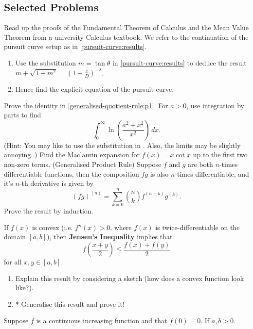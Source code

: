 \documentclass[../main.tex]{subfiles}
\begin{document}
\subsection{Selected Problems}
\problem Read up the proofs of the Fundamental Theorem of Calculus and the Mean Value Theorem from a university Calculus textbook.
\problem We refer to the continuation of the pursuit curve setup as in \ref{pursuit-curve:results}.
\begin{enumerate}
    \item Use the substitution $m=\tan\theta$ in \ref{pursuit-curve:results} to deduce the result $m+\sqrt{1+m^2}=\left(1-\frac{x}{D}\right)^{-\lambda}$.
    \item Hence find the explicit equation of the pursuit curve.
\end{enumerate}
\problem Prove the identity in \ref{generalised-quotient-rule:p1}.
\problem* For $a > 0$, use integration by parts to find
$$\int_{0}^{\infty}\ln{\left(\frac{a^2+x^2}{x^2}\right)}\, dx.$$
(Hint: You may like to use the substitution in . Also, the limits may be slightly annoying..)
\problem Find the Maclaurin expansion for $f(x)=x\cot{x}$ up to the first two non-zero terms.
\problem (Generalised Product Rule) Suppose $f$ and $g$ are both $n$-times differentiable functions, then the composition $fg$ is also $n$-times differentiable, and it's $n$-th derivative is given by
$$(fg)^{(n)}=\sum_{k=0}^{n}\binom{n}{k}f^{(n-k)}g^{(k)}.$$
Prove the result by induction.

\problem If $f(x)$ is convex (i.e. $f''(x)>0$, where $f(x)$ is twice-differentiable on the domain $[a,b]$), then \textbf{Jensen's Inequality} implies that $$f\left(\frac{x+y}{2}\right) \leq \frac{f(x)+f(y)}{2}$$
for all $x,y \in [a,b]$.
\begin{enumerate}
    \item Explain this result by considering a sketch (how does a convex function look like?).
    \item* Generalise this result and prove it!
\end{enumerate}

\problem Suppose $f$ is a continuous increasing function and that $f(0)=0$. If $a, b > 0$. 
\end{document}
